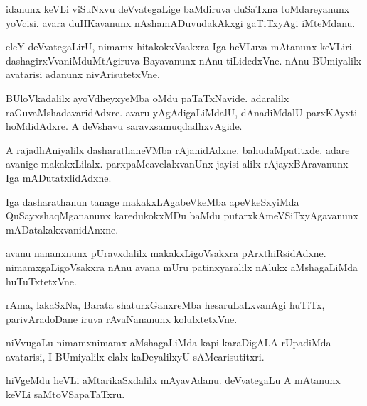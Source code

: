 \documentclass{article}
\begin{document}
\begin{mn}%
idanunx keVLi viSuNxvu deVvategaLige baMdiruva duSaTxna toMdareyanunx yoVcisi. avara 
duHKavanunx nAshamADuvudakAkxgi gaTiTxyAgi  iMteMdanu.
\end{mn}

\begin{mn}%
eleY deVvategaLirU, nimamx hitakokxVsakxra Iga heVLuva mAtanunx keVLiri. 
dashagirxVvaniMduMtAgiruva Bayavanunx nAnu tiLidedxVne. nAnu BUmiyalilx avatarisi adanunx 
nivArisutetxVne.
\end{mn}

\begin{mn}%
BUloVkadalilx ayoVdheyxyeMba oMdu paTaTxNavide. adaralilx raGuvaMshadavaridAdxre. avaru 
yAgAdigaLiMdalU, dAnadiMdalU parxKAyxti hoMdidAdxre. A deVshavu saravxsamuqdadhxvAgide.
\end{mn}

\begin{mn}%
A rajadhAniyalilx dasharathaneVMba rAjanidAdxne. bahudaMpatitxde. adare avanige 
makakxLilalx. parxpaMcavelalxvanUnx jayisi alilx rAjayxBAravanunx Iga mADutatxlidAdxne. 
\end{mn}

\begin{mn}%
Iga dasharathanun tanage makakxLAgabeVkeMba apeVkeSxyiMda QuSayxshaqMgananunx 
karedukokxMDu baMdu putarxkAmeVSiTxyAgavanunx mADatakakxvanidAnxne.
\end{mn}

\begin{mn}%
avanu nananxnunx pUravxdalilx makakxLigoVsakxra pArxthiRsidAdxne. nimamxgaLigoVsakxra nAnu 
avana mUru patinxyaralilx nAlukx aMshagaLiMda huTuTxtetxVne.
\end{mn}

\begin{mn}%
rAma, lakaSxNa, Barata shaturxGanxreMba hesaruLaLxvanAgi huTiTx, parivAradoDane iruva 
rAvaNananunx kolulxtetxVne.
\end{mn}

\begin{mn}%
niVvugaLu nimamxnimamx aMshagaLiMda kapi karaDigALA rUpadiMda avatarisi, I BUmiyalilx 
elalx kaDeyalilxyU sAMcarisutitxri.
\end{mn}

\begin{mn}%
hiVgeMdu heVLi aMtarikaSxdalilx mAyavAdanu. deVvategaLu A mAtanunx keVLi saMtoVSapaTaTxru.
\end{mn}
\end{document}
